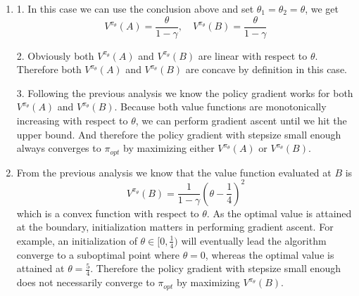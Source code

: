 \begin{Solution}
\begin{enumerate} [label=\alph*)]
        3. As $\pi_{opt}(\text{stay} \mid A) = 1$ and $\pi_{opt}(\text{switch} \mid B) = 1$, the optimal value of $\theta_1$ and $\theta_2$ is attained only at the upper bound. Note both $V^{\pi_\theta}(A)$ and $V^{\pi_\theta}(B)$ increase monotonically as $\theta_1$ and $\theta_2$ approach 1. However, observe that $V^{\pi_\theta}(A)$ achieves its maximum at $\theta_1 = 1$ and any $\theta_2 \in [0, 1]$. Therefore the policy gradient with stepsize small enough always converge to $\pi_{opt}$ by maximizing $V^{\pi_\theta}(B)$ but not $V^{\pi_\theta}(A)$.
        
        \item
        1. In this case we can use the conclusion above and set $\theta_1 = \theta_2 = \theta$, we get
        $$
        V^{\pi_\theta}(A) = \dfrac{\theta}{1 - \gamma}, \quad V^{\pi_\theta}(B) = \dfrac{\theta}{1 - \gamma}
        $$
        \vspace{1em}
        
        2. Obviously both $V^{\pi_\theta}(A)$ and $V^{\pi_\theta}(B)$ are linear with respect to $\theta$. Therefore both $V^{\pi_\theta}(A)$ and $V^{\pi_\theta}(B)$ are concave by definition in this case.
        \vspace{1em}
        
        3. Following the previous analysis we know the policy gradient works for both $V^{\pi_\theta}(A)$ and $V^{\pi_\theta}(B)$. Because both value functions are monotonically increasing with respect to $\theta$, we can perform gradient ascent until we hit the upper bound. And therefore the policy gradient with stepsize small enough always converges to $\pi_{opt}$ by maximizing either $V^{\pi_\theta}(A)$ or $V^{\pi_\theta}(B)$.
        
        \item
        From the previous analysis we know that the value function evaluated at $B$ is
        $$
        V^{\pi_\theta}(B) = \dfrac{1}{1 - \gamma}\left (\theta - \dfrac{1}{4} \right )^2
        $$
        which is a convex function with respect to $\theta$. As the optimal value is attained at the boundary, initialization matters in performing gradient ascent. For example, an initialization of $\theta \in [0, \frac{1}{4})$ will eventually lead the algorithm converge to a suboptimal point where $\theta = 0$, whereas the optimal value is attained at $\theta = \frac{5}{4}$. Therefore the policy gradient with stepsize small enough does not necessarily converge to $\pi_{opt}$ by maximizing $V^{\pi_\theta}(B)$.
    \end{enumerate}
\end{Solution}


